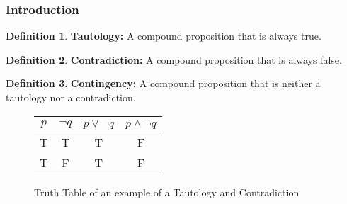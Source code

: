 \documentclass[article, 11pt]{article}
\theoremstyle{definition}
\newtheorem{definition}{Definition}[section]
\begin{document}
    \subsubsection{Introduction}
    \begin{definition}
        \textbf{Tautology:} A compound proposition that is always true.
    \end{definition}
    \begin{definition}
        \textbf{Contradiction:} A compound proposition that is always false.  
    \end{definition}
    \begin{definition}
        \textbf{Contingency:} A compound proposition that is neither a tautology nor a contradiction. 
    \end{definition}
    \begin{figure}[H]
        \centering
        \begin{tabular}{c|c|c|c}
            $p$ & $\neg q$ & $p \lor \neg q$ & $p \land \neg q$ \\
            \hline
            T & T & T & F \\
            T & F & T & F \\
        \end{tabular}
        \caption{Truth Table of an example of a Tautology and Contradiction}
    \end{figure}
\end{document}
